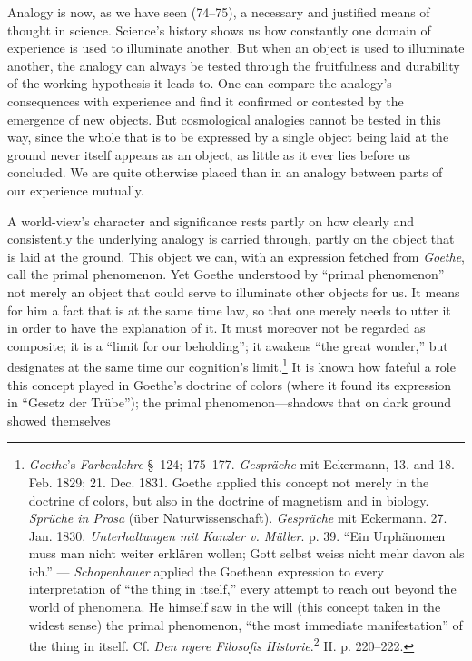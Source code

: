 \documentclass[12pt,a4paper]{book}
\newcommand{\opage}[1]{\marginnote{\footnotesize\textit{[#1]}}}
\begin{document}
Analogy is now, as we have seen (74--75), a necessary and justified means of thought in science.
Science's history shows us how constantly one domain of experience is used to illuminate another.
But when an object is used to illuminate another, the analogy can always be tested through the
fruitfulness and durability of the working hypothesis it leads to. One can compare the analogy's
consequences with experience and find it confirmed or contested by the emergence of new objects.
But cosmological analogies cannot be tested in this way, since the whole that is to be expressed
by a single object being laid at the ground never itself appears as an object, as little as it
ever lies before us concluded. We are quite otherwise placed than in an analogy between parts of
our experience mutually.

A world-view's character and significance rests partly on how clearly and consistently the
underlying analogy is carried through, partly on the object that is laid at the ground. This
object we can, with an expression fetched from \emph{Goethe}, call the primal phenomenon. Yet
Goethe understood by ``primal phenomenon'' not merely an object that could serve to illuminate
other objects for us. It means for him a fact that is at the same time law, so that one merely
needs to utter it in order to have the explanation of it. It must moreover not be \opage{312}regarded as
composite; it is a ``limit for our beholding''; it awakens ``the great wonder,'' but designates
at the same time our cognition's limit.\footnote{\emph{Goethe}'s \emph{Farbenlehre} \S\ 124;
175--177. \emph{Gespräche} mit Eckermann, 13. and 18. Feb. 1829; 21. Dec. 1831. Goethe applied
this concept not merely in the doctrine of colors, but also in the doctrine of magnetism and in
biology. \emph{Sprüche in Prosa} (über Naturwissenschaft). \emph{Gespräche} mit Eckermann. 27.
Jan. 1830. \emph{Unterhaltungen mit Kanzler v. Müller}. p. 39. ``Ein Urphänomen muss man nicht
weiter erklären wollen; Gott selbst weiss nicht mehr davon als ich.'' --- \emph{Schopenhauer}
applied the Goethean expression to every interpretation of ``the thing in itself,'' every attempt
to reach out beyond the world of phenomena. He himself saw in the will (this concept taken in the
widest sense) the primal phenomenon, ``the most immediate manifestation'' of the thing in itself.
Cf. \emph{Den nyere Filosofis Historie}.\textsuperscript{2} II. p. 220--222.} It is known how
fateful a role this concept played in Goethe's doctrine of colors (where it found its expression
in ``Gesetz der Trübe''); the primal phenomenon---shadows that on dark ground showed themselves
\end{document}
